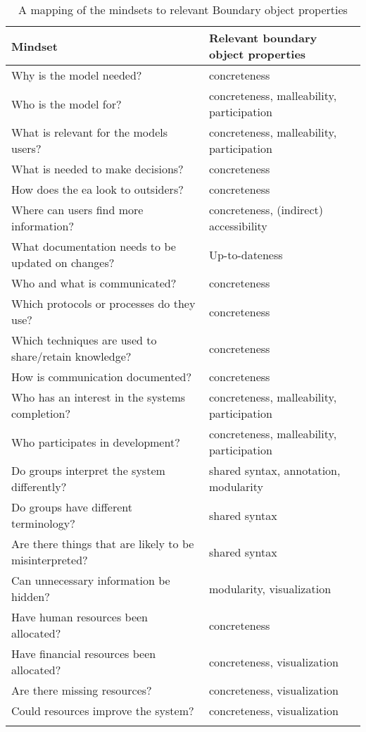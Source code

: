 {\centering
\begin{longtable}{|p{6cm}|p{6cm}|}
    \hline
    Mindset & Relevant \gls{boundary object} properties \\ \hline
    Why is the model needed? & concreteness\\ \hline
    Who is the model for? & concreteness, malleability, participation \\ \hline

    What is relevant for the models users? & concreteness, malleability, participation\\ \hline
    What is needed to make decisions? & concreteness \\ \hline
    How does the \gls{ea} look to outsiders? & concreteness\\ \hline

    Where can users find more information? & concreteness, (indirect) accessibility \\ \hline
    What documentation needs to be updated on changes? &  Up-to-dateness \\ \hline

    Who and what is communicated? & concreteness \\ \hline
    Which protocols or processes do they use? & concreteness \\ \hline
    Which techniques are used to share/retain knowledge? & concreteness \\ \hline
    How is communication documented? & concreteness\\ \hline

    Who has an interest in the systems completion? & concreteness, malleability, participation \\ \hline
    Who participates in development? & concreteness, malleability, participation \\ \hline

    Do groups interpret the system differently? & shared syntax, annotation, modularity\\ \hline
    Do groups have different terminology? & shared syntax \\ \hline
    Are there things that are likely to be misinterpreted? & shared syntax \\ \hline
    Can unnecessary information be hidden? & modularity, visualization\\ \hline
    
    Have human resources been allocated? & concreteness \\ \hline
    Have financial resources been allocated? & concreteness, visualization \\ \hline
    Are there missing resources? & concreteness, visualization \\ \hline
    Could resources improve the system? & concreteness, visualization \\ \hline
    
    \caption{A mapping of the mindsets to relevant Boundary object properties}
    \label{tab:4-mindset-properties}
\end{longtable}}